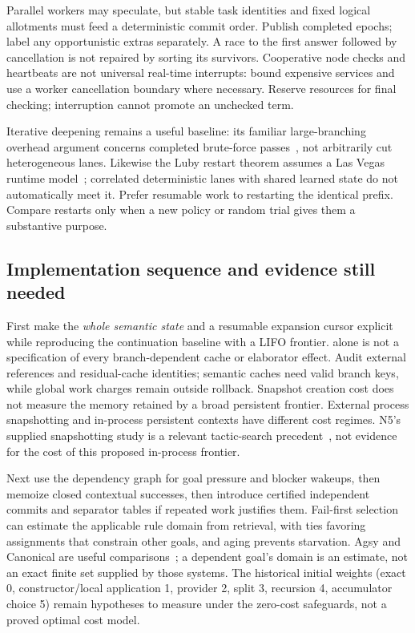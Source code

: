 Parallel workers may speculate, but stable task identities and fixed logical
allotments must feed a deterministic commit order. Publish completed epochs;
label any opportunistic extras separately. A race to the first answer followed
by cancellation is not repaired by sorting its survivors. Cooperative node
checks and heartbeats are not universal real-time interrupts: bound expensive
services and use a worker cancellation boundary where necessary. Reserve
resources for final checking; interruption cannot promote an unchecked term.

Iterative deepening remains a useful baseline: its familiar large-branching
overhead argument concerns completed brute-force passes~\cite{korf85}, not
arbitrarily cut heterogeneous lanes. Likewise the Luby restart theorem assumes
a Las Vegas runtime model~\cite{luby93}; correlated deterministic lanes with
shared learned state do not automatically meet it. Prefer resumable work to
restarting the identical prefix. Compare restarts only when a new policy or
random trial gives them a substantive purpose.

\subsection{Implementation sequence and evidence still needed}
\label{sec:search-experiments}

First make the \emph{whole semantic state} and a resumable expansion cursor
explicit while reproducing the continuation baseline with a LIFO frontier.
 alone is not a specification of every branch-dependent
cache or elaborator effect. Audit external references and residual-cache
identities; semantic caches need valid branch keys, while global work charges
remain outside rollback. Snapshot creation cost does not measure the memory
retained by a broad persistent frontier. External process snapshotting and
in-process persistent contexts have different cost regimes. N5's supplied
snapshotting study is a relevant tactic-search precedent~\cite{snapshot},
not evidence for the cost of this proposed in-process frontier.

Next use the dependency graph for goal pressure and blocker wakeups, then
memoize closed contextual successes, then introduce certified independent
commits and separator tables if repeated work justifies them. Fail-first
selection can estimate the applicable rule domain from retrieval, with ties
favoring assignments that constrain other goals, and aging prevents starvation.
Agsy and Canonical are useful comparisons~\cite{agsy,canonical}; a dependent
goal's domain is an estimate, not an exact finite set supplied by those systems.
The historical initial weights (exact 0, constructor/local application 1,
provider 2, split 3, recursion 4, accumulator choice 5) remain hypotheses to
measure under the zero-cost safeguards, not a proved optimal cost model.

